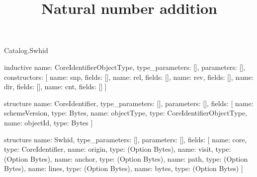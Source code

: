 \begin{lexlean}{Catalog.Swhid}
\title{Natural number addition}
\begin{semanticmodule}
inductive{
  name: CoreIdentifierObjectType,
  type_parameters: [],
  parameters: [],
  constructors: [
    {name: snp, fields: []},
    {name: rel, fields: []},
    {name: rev, fields: []},
    {name: dir, fields: []},
    {name: cnt, fields: []}
  ]
}

structure{
  name: CoreIdentifier,
  type_parameters: [],
  parameters: [],
  fields: [
    {name: schemeVersion, type: Bytes},
    {name: objectType, type: CoreIdentifierObjectType},
    {name: objectId, type: Bytes}
  ]
}

structure{
  name: Swhid,
  type_parameters: [],
  parameters: [],
  fields: [
    {name: core, type: CoreIdentifier},
    {name: origin, type: (Option Bytes)},
    {name: visit, type: (Option Bytes)},
    {name: anchor, type: (Option Bytes)},
    {name: path, type: (Option Bytes)},
    {name: lines, type: (Option Bytes)},
    {name: bytes, type: (Option Bytes)}
  ]
}
\end{semanticmodule}
\end{lexlean}
